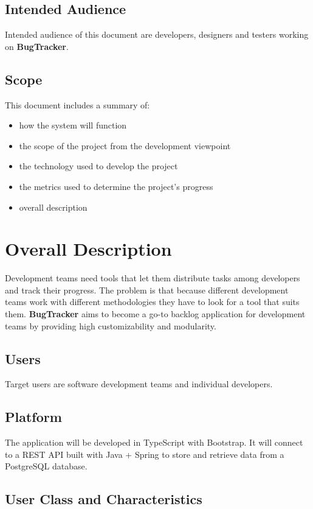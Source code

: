 \documentclass[a4paper]{article}
\newcommand{\appNameBold}{\textbf{BugTracker}}
\begin{document}
    \subsection{Intended Audience}
    Intended audience of this document are developers, designers and testers working on \appNameBold{}.

    \subsection{Scope}
    This document includes a summary of:
    \begin{itemize}
        \item how the system will function
        \item the scope of the project from the development viewpoint
        \item the technology used to develop the project
        \item the metrics used to determine the project's progress
        \item overall description
    \end{itemize}




    \pagebreak
    \section{Overall Description}
    Development teams need tools that let them distribute tasks among developers and track their progress.
    The problem is that because different development teams work with different methodologies they have to look for a tool that suits them.
    \appNameBold{} aims to become a go-to backlog application for development teams by providing high customizability and modularity.

    \subsection{Users}
    Target users are software development teams and individual developers.

    \subsection{Platform}
    The application will be developed in TypeScript with Bootstrap. It will connect to a REST API built with Java + Spring to store and retrieve data from a PostgreSQL database.

    \subsection{User Class and Characteristics}
\end{document}
